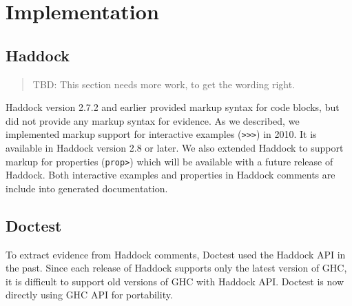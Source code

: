 \documentclass[preprint]{sigplanconf}
\begin{document}
\section{Implementation}

\subsection{Haddock}
\label{sec:haddock}

\begin{quote}
    TBD: This section needs more work, to get the wording right.
\end{quote}

Haddock version 2.7.2 and earlier provided markup syntax for
code blocks, but did not provide any markup syntax for evidence.
As we described, we implemented markup support for interactive examples ({\tt >>>}) in 2010.
It is available in Haddock version 2.8 or later.
We also extended Haddock to support markup for properties ({\tt prop>}) which
will be available with a future release of Haddock.
Both interactive examples and properties in Haddock comments are
include into generated documentation.




\subsection{Doctest}
\label{sec:doctest}

To extract evidence from Haddock comments,
Doctest used the Haddock API in the past.
Since each release of Haddock supports only the latest version of GHC,
it is difficult to support old versions of GHC with Haddock API.
Doctest is now directly using GHC API for portability.
\end{document}
